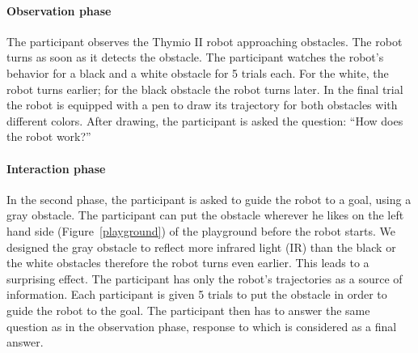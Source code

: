 \documentclass{sig-alternate}
\begin{document}
\paragraph{Observation phase} The participant observes the Thymio II robot
approaching obstacles. The robot turns as soon as it detects the
obstacle. The participant watches the robot's behavior for a black and a
white obstacle for 5 trials each. For the white, the robot turns
earlier; for the black obstacle the robot turns later. In the final
trial the robot is equipped with a pen to draw its trajectory for both
obstacles with different colors. After drawing, the participant is asked
the question: ``How does the robot work?''

\paragraph{Interaction phase} In the second phase, the participant is asked
to guide the robot to a goal, using a gray obstacle. The participant can put the
obstacle wherever he likes on the left hand side (Figure~\ref{playground}) of
the playground before the robot starts. We designed the gray obstacle to reflect
more infrared light (IR) than the black or the white obstacles therefore the
robot turns even earlier. This leads to a surprising effect. The participant has
only the robot's trajectories as a source of information. Each participant is
given 5 trials to put the obstacle in order to guide the robot to the goal. The
participant then has to answer the same question as in the observation phase,
response to which is considered as a final answer.
\end{document}
